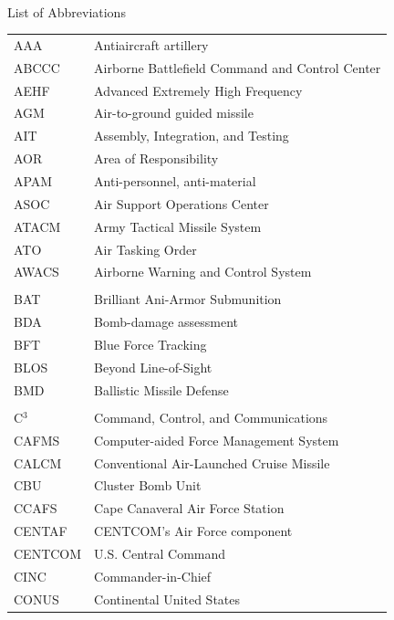 

\renewcommand{\baselinestretch}{1}
\small\normalsize
\hbox{\ }

\vspace{.5in}

\begin{center}
\large{List of Abbreviations}
\end{center} 

\vspace{3pt}

\begin{supertabular}{ll}
AAA & Antiaircraft artillery \\
ABCCC & Airborne Battlefield Command and Control Center \\
AEHF & Advanced Extremely High Frequency \\
AGM & Air-to-ground guided missile \\
AIT & Assembly, Integration, and Testing \\
AOR & Area of Responsibility \\
APAM & Anti-personnel, anti-material \\
ASOC & Air Support Operations Center \\
ATACM & Army Tactical Missile System \\
ATO & Air Tasking Order \\
AWACS & Airborne Warning and Control System \\
\\
BAT & Brilliant Ani-Armor Submunition \\
BDA & Bomb-damage assessment  \\
BFT & Blue Force Tracking \\
BLOS & Beyond Line-of-Sight \\
BMD & Ballistic Missile Defense \\
\\
C$^{3}$ & Command, Control, and Communications \\
CAFMS & Computer-aided Force Management System \\
CALCM & Conventional Air-Launched Cruise Missile \\
CBU & Cluster Bomb Unit \\
CCAFS & Cape Canaveral Air Force Station \\
CENTAF & CENTCOM's Air Force component \\
CENTCOM & U.S. Central Command \\
CINC & Commander-in-Chief \\
CONUS & Continental United States \\

\end{supertabular}
